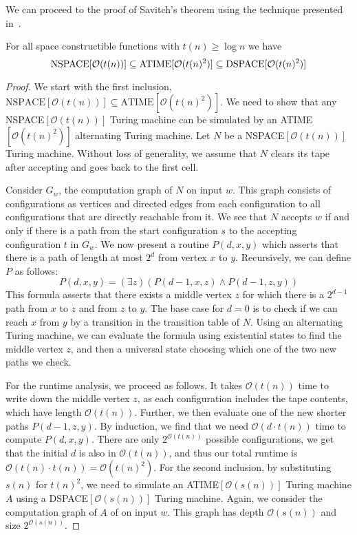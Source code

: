 We can proceed to the proof of Savitch's theorem using the technique presented in~\cite{descriptive-complexity}.
\begin{theorem}
    For all space constructible functions with $t(n) \geq \log n$ we have
    \[
        \text{\upshape NSPACE}[\mathcal{O}(t(n))] \subseteq \text{\upshape ATIME}[\mathcal{O}(t(n)^2)] \subseteq \text{\upshape DSPACE}[\mathcal{O}(t(n)^2)]
    \]
\end{theorem}

\begin{proof}
    We start with the first inclusion, $\text{NSPACE$[\mathcal{O}(t(n))]$} \subseteq \text{ATIME$[\mathcal{O}(t(n)^2)]$}$.
    We need to show that any NSPACE$[\mathcal{O}(t(n))]$ Turing machine can be simulated by an ATIME$[\mathcal{O}(t(n)^2)]$ alternating Turing machine.
    Let $N$ be a NSPACE$[\mathcal{O}(t(n))]$ Turing machine.
    Without loss of generality, we assume that $N$ clears its tape after accepting and goes back to the first cell.

    Consider $G_w$, the computation graph of $N$ on input $w$.
    This graph consists of configurations as vertices and directed edges from each configuration to all configurations that are directly reachable from it.
    We see that $N$ accepts $w$ if and only if there is a path from the start configuration $s$ to the accepting configuration $t$ in $G_w$.
    We now present a routine $P(d, x, y)$ which asserts that there is a path of length at most $2^{d}$ from vertex $x$ to $y$.
    Recursively, we can define $P$ as follows:
    \[
        P(d, x, y) = (\exists z)(P(d - 1, x, z) \land P(d - 1, z, y))
    \]
    This formula asserts that there exists a middle vertex $z$ for which there is a $2^{d - 1}$ path from $x$ to $z$ and from $z$ to $y$.
    The base case for $d = 0$ is to check if we can reach $x$ from $y$ by a transition in the transition table of $N$.
    Using an alternating Turing machine, we can evaluate the formula using existential states to find the middle vertex $z$, and then a universal state choosing which one of the two new paths we check.

    For the runtime analysis, we proceed as follows.
    It takes $\mathcal{O}(t(n))$ time to write down the middle vertex $z$, as each configuration includes the tape contents, which have length $\mathcal{O}(t(n))$.
    Further, we then evaluate one of the new shorter paths $P(d - 1, z, y)$.
    By induction, we find that we need $\mathcal{O}(d\cdot t(n))$ time to compute $P(d, x, y)$.
    There are only $2^{\mathcal{O}(t(n))}$ possible configurations, we get that the initial $d$ is also in $\mathcal{O}(t(n))$, and thus our total runtime is $\mathcal{O}(t(n)\cdot t(n)) = \mathcal{O}(t(n)^2)$.
    \vspace{5mm}
    \sloppy For the second inclusion, by substituting $s(n)$ for $t(n)^2$, we need to simulate an ATIME$[\mathcal{O}(s(n))]$ Turing machine $A$ using a DSPACE$[\mathcal{O}(s(n))]$ Turing machine.
    Again, we consider the computation graph of $A$ of on input $w$.
    This graph has depth $\mathcal{O}(s(n))$ and size $2^{\mathcal{O}(s(n))}$.


\end{proof}

